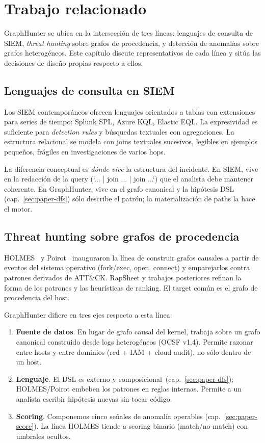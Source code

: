 \chapter{Trabajo relacionado}
\label{sec:paper-related}

GraphHunter se ubica en la intersección de tres líneas: lenguajes
de consulta de SIEM, \emph{threat hunting} sobre grafos de
procedencia, y detección de anomalías sobre grafos heterogéneos.
Este capítulo discute representativos de cada línea y sitúa las
decisiones de diseño propias respecto a ellos.

\section{Lenguajes de consulta en SIEM}

Los SIEM contemporáneos ofrecen lenguajes orientados a tablas con
extensiones para series de tiempo: Splunk SPL, Azure KQL, Elastic
EQL. La expresividad es suficiente para \emph{detection rules} y
búsquedas textuales con agregaciones. La estructura relacional se
modela con joins textuales sucesivos, legibles en ejemplos
pequeños, frágiles en investigaciones de varios hops.

La diferencia conceptual es \emph{dónde vive} la estructura del
incidente. En SIEM, vive en la redacción de la query (`... | join
... | join ...`) que el analista debe mantener coherente. En
GraphHunter, vive en el grafo canonical y la hipótesis DSL
(cap.~\ref{sec:paper-dfs}) sólo describe el patrón; la
materialización de paths la hace el motor.

\section{Threat hunting sobre grafos de procedencia}

HOLMES~\cite{milajerdi2019holmes} y Poirot~\cite{milajerdi2019poirot}
inauguraron la línea de construir grafos causales a partir de
eventos del sistema operativo (fork/exec, open, connect) y
emparejarlos contra patrones derivados de ATT\&CK. RapSheet y
trabajos posteriores refinan la forma de los patrones y las
heurísticas de ranking. El target común es el grafo de procedencia
del host.

GraphHunter difiere en tres ejes respecto a esta línea:

\begin{enumerate}
    \item \textbf{Fuente de datos}. En lugar de grafo causal del
    kernel, trabaja sobre un grafo canonical construido desde logs
    heterogéneos (OCSF v1.4). Permite razonar entre hosts y entre
    dominios (red + IAM + cloud audit), no sólo dentro de un host.
    \item \textbf{Lenguaje}. El DSL es externo y
    composicional~(cap.~\ref{sec:paper-dfs}); HOLMES/Poirot
    embeben los patrones en reglas internas. Permite a un analista
    escribir hipótesis nuevas sin tocar código.
    \item \textbf{Scoring}. Componemos cinco señales de anomalía
    operables (cap.~\ref{sec:paper-score}). La línea HOLMES tiende
    a scoring binario (match/no-match) con umbrales ocultos.
\end{enumerate}


